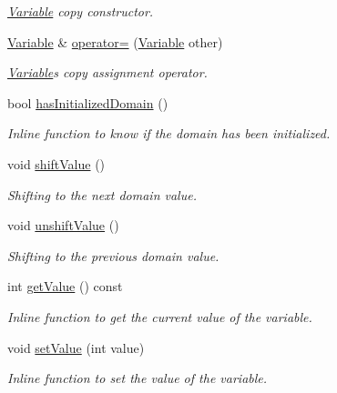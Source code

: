 \begin{DoxyCompactItemize}
\begin{DoxyCompactList}\small\item\em \hyperlink{classghost_1_1Variable}{Variable} copy constructor. \end{DoxyCompactList}\item 
\hyperlink{classghost_1_1Variable}{Variable} \& \hyperlink{classghost_1_1Variable_ad82b892892c3531cc3d54d6b5d048bf6}{operator=} (\hyperlink{classghost_1_1Variable}{Variable} other)
\begin{DoxyCompactList}\small\item\em \hyperlink{classghost_1_1Variable}{Variable}\textquotesingle{}s copy assignment operator. \end{DoxyCompactList}\item 
bool \hyperlink{classghost_1_1Variable_abd6ccef9baff609eb4fadaeca2f2bceb}{has\+Initialized\+Domain} ()
\begin{DoxyCompactList}\small\item\em Inline function to know if the domain has been initialized. \end{DoxyCompactList}\item 
void \hyperlink{classghost_1_1Variable_a8afe14b1858476bf4ef59a41a2947f93}{shift\+Value} ()
\begin{DoxyCompactList}\small\item\em Shifting to the next domain value. \end{DoxyCompactList}\item 
void \hyperlink{classghost_1_1Variable_a3bebc2cc15609a5280a4949d63f7405d}{unshift\+Value} ()
\begin{DoxyCompactList}\small\item\em Shifting to the previous domain value. \end{DoxyCompactList}\item 
int \hyperlink{classghost_1_1Variable_ae6dcadf662fc318265a9741d91a0e56e}{get\+Value} () const 
\begin{DoxyCompactList}\small\item\em Inline function to get the current value of the variable. \end{DoxyCompactList}\item 
void \hyperlink{classghost_1_1Variable_aadbc00de3ee4cb0f51a306b2639f1ea9}{set\+Value} (int value)
\begin{DoxyCompactList}\small\item\em Inline function to set the value of the variable. \end{DoxyCompactList}\item 

\end{DoxyCompactItemize}

